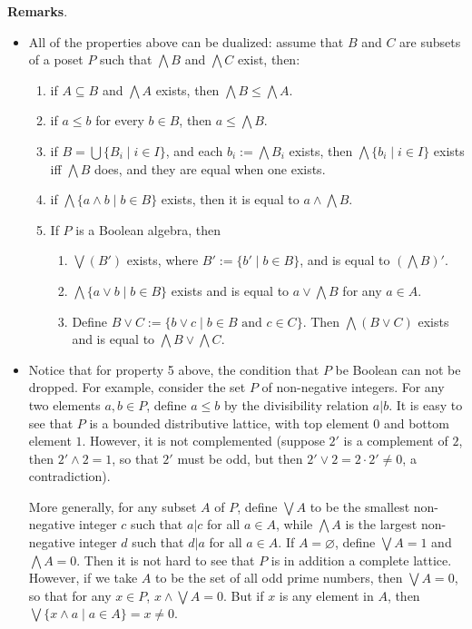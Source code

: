\documentclass[12pt]{article}
\begin{document}
\textbf{Remarks}.  
\begin{itemize}
\item
All of the properties above can be dualized: assume that $B$ and $C$ are subsets of a poset $P$ such that $\bigwedge B$ and $\bigwedge C$ exist, then:
\begin{enumerate}
\item if $A\subseteq B$ and $\bigwedge A$ exists, then $\bigwedge B\le \bigwedge A$.
\item if $a\le b$ for every $b\in B$, then $a\le \bigwedge B$.
\item if $B=\bigcup \lbrace B_i\mid i\in I\rbrace$, and each $b_i:=\bigwedge B_i$ exists, then $\bigwedge \lbrace b_i\mid i\in I\rbrace$ exists iff $\bigwedge B$ does, and they are equal when one exists.
\item if $\bigwedge \lbrace a\wedge b\mid b\in B\rbrace$ exists, then it is equal to $a\wedge \bigwedge B$.
\item If $P$ is a Boolean algebra, then 
\begin{enumerate}
\item $\bigvee (B')$ exists, where $B':=\lbrace b'\mid b\in B\rbrace$, and is equal to $(\bigwedge B)'$.
\item $\bigwedge \lbrace a\vee b\mid b\in B\rbrace$ exists and is equal to $a\vee \bigwedge B$ for any $a\in A$.
\item Define $B\vee C:=\lbrace b\vee c\mid b\in B\mbox{ and }c\in C\rbrace.$  Then $\bigwedge (B\vee C)$ exists and is equal to $\bigwedge B\vee \bigwedge C$.
\end{enumerate}
\end{enumerate}
\item Notice that for property 5 above, the condition that $P$ be Boolean can not be dropped.  For example, consider the set $P$ of non-negative integers.  For any two elements $a,b\in P$, define $a\le b$ by the divisibility relation $a|b$.  It is easy to see that $P$ is a bounded distributive lattice, with top element $0$ and bottom element $1$.  However, it is not complemented (suppose $2'$ is a complement of $2$, then $2'\wedge 2=1$, so that $2'$ must be odd, but then $2'\vee 2=2\cdot 2'\ne 0$, a contradiction).  

More generally, for any subset $A$ of $P$, define $\bigvee A$ to be the smallest non-negative integer $c$ such that $a|c$ for all $a\in A$, while $\bigwedge A$ is the largest non-negative integer $d$ such that $d|a$ for all $a\in A$.  If $A=\varnothing$, define $\bigvee A=1$ and $\bigwedge A=0$.  Then it is not hard to see that $P$ is in addition a complete lattice.  However, if we take $A$ to be the set of all odd prime numbers, then $\bigvee A=0$, so that for any $x\in P$, $x\wedge \bigvee A=0$.  But if $x$ is any element in $A$, then $\bigvee \lbrace x\wedge a\mid a\in A\rbrace=x\ne 0$.
\end{itemize}
\end{document}
